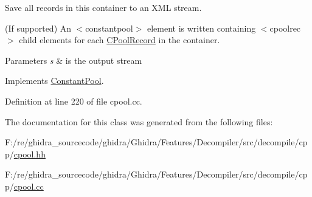 Save all records in this container to an X\+ML stream. 

(If supported) An $<$constantpool$>$ element is written containing $<$cpoolrec$>$ child elements for each \mbox{\hyperlink{class_c_pool_record}{C\+Pool\+Record}} in the container. 
\begin{DoxyParams}{Parameters}
{\em s} & is the output stream \\
\hline
\end{DoxyParams}


Implements \mbox{\hyperlink{class_constant_pool_a859daeda0a7969af5462f6484905ab08}{Constant\+Pool}}.



Definition at line 220 of file cpool.\+cc.



The documentation for this class was generated from the following files\+:\begin{DoxyCompactItemize}
\item 
F\+:/re/ghidra\+\_\+sourcecode/ghidra/\+Ghidra/\+Features/\+Decompiler/src/decompile/cpp/\mbox{\hyperlink{cpool_8hh}{cpool.\+hh}}\item 
F\+:/re/ghidra\+\_\+sourcecode/ghidra/\+Ghidra/\+Features/\+Decompiler/src/decompile/cpp/\mbox{\hyperlink{cpool_8cc}{cpool.\+cc}}\end{DoxyCompactItemize}
